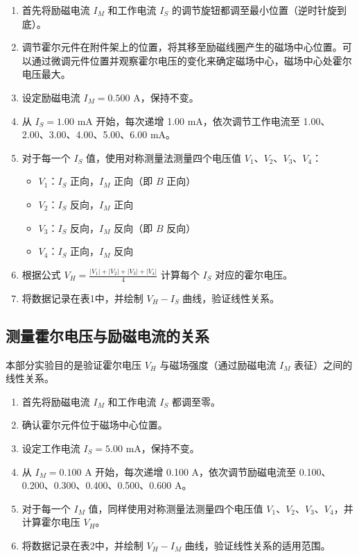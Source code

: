 ﻿\documentclass[12pt,a4paper]{article}
\begin{document}
\begin{enumerate}
    \item 首先将励磁电流 $I_M$ 和工作电流 $I_S$ 的调节旋钮都调至最小位置（逆时针旋到底）。
    
    \item 调节霍尔元件在附件架上的位置，将其移至励磁线圈产生的磁场中心位置。可以通过微调元件位置并观察霍尔电压的变化来确定磁场中心，磁场中心处霍尔电压最大。
    
    \item 设定励磁电流 $I_M = 0.500$ A，保持不变。
    
    \item 从 $I_S = 1.00$ mA 开始，每次递增 1.00 mA，依次调节工作电流至 1.00、2.00、3.00、4.00、5.00、6.00 mA。
    
    \item 对于每一个 $I_S$ 值，使用对称测量法测量四个电压值 $V_1$、$V_2$、$V_3$、$V_4$：
    \begin{itemize}
        \item $V_1$：$I_S$ 正向，$I_M$ 正向（即 $B$ 正向）
        \item $V_2$：$I_S$ 反向，$I_M$ 正向
        \item $V_3$：$I_S$ 反向，$I_M$ 反向（即 $B$ 反向）
        \item $V_4$：$I_S$ 正向，$I_M$ 反向
    \end{itemize}
    
    \item 根据公式 $V_H = \frac{|V_1| + |V_2| + |V_3| + |V_4|}{4}$ 计算每个 $I_S$ 对应的霍尔电压。
    
    \item 将数据记录在表1中，并绘制 $V_H - I_S$ 曲线，验证线性关系。
\end{enumerate}

\subsection{测量霍尔电压与励磁电流的关系}

本部分实验目的是验证霍尔电压 $V_H$ 与磁场强度（通过励磁电流 $I_M$ 表征）之间的线性关系。

\begin{enumerate}
    \item 首先将励磁电流 $I_M$ 和工作电流 $I_S$ 都调至零。
    
    \item 确认霍尔元件位于磁场中心位置。
    
    \item 设定工作电流 $I_S = 5.00$ mA，保持不变。
    
    \item 从 $I_M = 0.100$ A 开始，每次递增 0.100 A，依次调节励磁电流至 0.100、0.200、0.300、0.400、0.500、0.600 A。
    
    \item 对于每一个 $I_M$ 值，同样使用对称测量法测量四个电压值 $V_1$、$V_2$、$V_3$、$V_4$，并计算霍尔电压 $V_H$。
    
    \item 将数据记录在表2中，并绘制 $V_H - I_M$ 曲线，验证线性关系的适用范围。
\end{enumerate}
\end{document}

